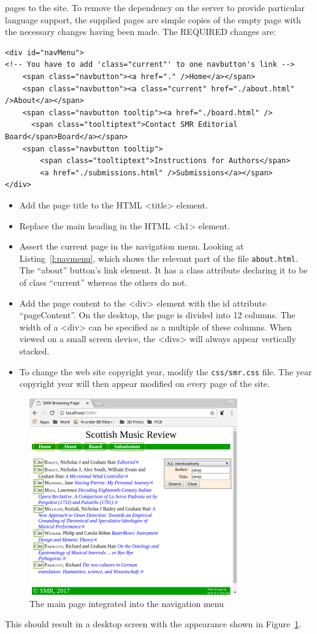 \documentclass[a4paper,10pt]{SMR}
\begin{document}
pages to the site. To remove the dependency on the server to provide
particular language support, the supplied pages are simple copies of
the empty page with the necessary changes having been made.
The REQUIRED changes are:
\begin{lstlisting}
<div id="navMenu">
<!-- You have to add 'class="current"' to one navbutton's link -->
	<span class="navbutton"><a href="." />Home</a></span>
	<span class="navbutton"><a class="current" href="./about.html" />About</a></span>
	<span class="navbutton tooltip"><a href="./board.html" />
	  <span class="tooltiptext">Contact SMR Editorial Board</span>Board</a></span>
	<span class="navbutton tooltip">
		<span class="tooltiptext">Instructions for Authors</span>
		<a href="./submissions.html" />Submissions</a></span>
</div>
\end{lstlisting}
\begin{itemize}
 \item Add the page title to the HTML <title> element.
 \item Replace the main heading in the HTML <h1> element.
 \item Assert the current page in the navigation menu. Looking at Listing~\ref{l:navmenu},
 which shows the relevant part of the file \texttt{about.html}. The ``about'' button's
 link element. It has a class attribute declaring it to be of class ``current''
 whereas the others do not.
 \item Add the page content to the <div> element with the id attribute ``pageContent''.
 On the desktop, the page is divided into 12 columns. The width of a <div> can
 be specified as a multiple of these columns. When viewed on a small screen
 device, the <divs> will always appear vertically stacked.
 \item To change the web site copyright year, modify the \texttt{css/smr.css} file.
 The year copyright year will then appear modified on every page of the site.
\end{itemize}

\begin{figure}
 \begin{center}
  \includegraphics[width=0.8\textwidth]{navbar.png}
 \end{center}
 \caption{The main page integrated into the navigation menu}
 \label{f:navbar}
\end{figure}

This should result in a desktop screen with the appearance shown in
Figure~\ref{f:navbar}.
\end{document}
